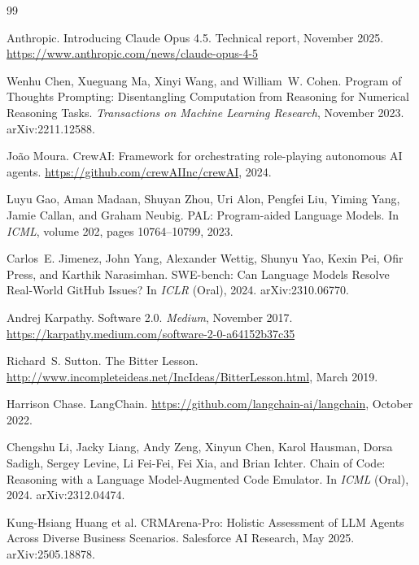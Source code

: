 \documentclass[11pt]{article}
\begin{document}
\begin{thebibliography}{99}

Anthropic.
\newblock Introducing Claude Opus 4.5.
\newblock Technical report, November 2025.
\newblock \url{https://www.anthropic.com/news/claude-opus-4-5}

Wenhu Chen, Xueguang Ma, Xinyi Wang, and William~W. Cohen.
\newblock Program of Thoughts Prompting: Disentangling Computation from Reasoning for Numerical Reasoning Tasks.
\newblock \emph{Transactions on Machine Learning Research}, November 2023.
\newblock arXiv:2211.12588.

Jo\~{a}o Moura.
\newblock CrewAI: Framework for orchestrating role-playing autonomous AI agents.
\newblock \url{https://github.com/crewAIInc/crewAI}, 2024.

Luyu Gao, Aman Madaan, Shuyan Zhou, Uri Alon, Pengfei Liu, Yiming Yang, Jamie Callan, and Graham Neubig.
\newblock PAL: Program-aided Language Models.
\newblock In \emph{ICML}, volume 202, pages 10764--10799, 2023.

Carlos~E. Jimenez, John Yang, Alexander Wettig, Shunyu Yao, Kexin Pei, Ofir Press, and Karthik Narasimhan.
\newblock SWE-bench: Can Language Models Resolve Real-World GitHub Issues?
\newblock In \emph{ICLR} (Oral), 2024.
\newblock arXiv:2310.06770.

Andrej Karpathy.
\newblock Software 2.0.
\newblock \emph{Medium}, November 2017.
\newblock \url{https://karpathy.medium.com/software-2-0-a64152b37c35}

Richard~S. Sutton.
\newblock The Bitter Lesson.
\newblock \url{http://www.incompleteideas.net/IncIdeas/BitterLesson.html}, March 2019.

Harrison Chase.
\newblock LangChain.
\newblock \url{https://github.com/langchain-ai/langchain}, October 2022.

Chengshu Li, Jacky Liang, Andy Zeng, Xinyun Chen, Karol Hausman, Dorsa Sadigh, Sergey Levine, Li Fei-Fei, Fei Xia, and Brian Ichter.
\newblock Chain of Code: Reasoning with a Language Model-Augmented Code Emulator.
\newblock In \emph{ICML} (Oral), 2024.
\newblock arXiv:2312.04474.

Kung-Hsiang Huang et al.
\newblock CRMArena-Pro: Holistic Assessment of LLM Agents Across Diverse Business Scenarios.
\newblock Salesforce AI Research, May 2025.
\newblock arXiv:2505.18878.


\end{thebibliography}
\end{document}
